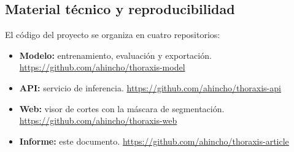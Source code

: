 \subsection{Material técnico y reproducibilidad}\label{sec:repositories}
El código del proyecto se organiza en cuatro repositorios:

\begin{itemize}
    \item \textbf{Modelo:} entrenamiento, evaluación y exportación.
          \url{https://github.com/ahincho/thoraxis-model}
    \item \textbf{API:} servicio de inferencia.
          \url{https://github.com/ahincho/thoraxis-api}
    \item \textbf{Web:} visor de cortes con la máscara de segmentación.
          \url{https://github.com/ahincho/thoraxis-web}
    \item \textbf{Informe:} este documento.
          \url{https://github.com/ahincho/thoraxis-article}
\end{itemize}

